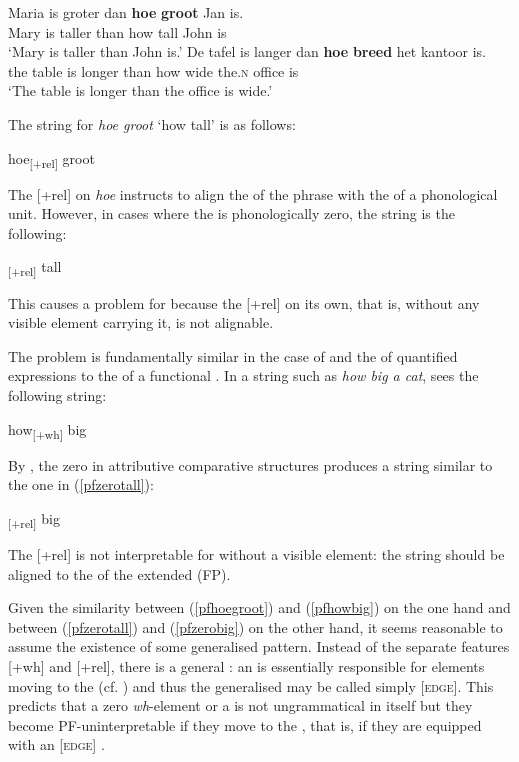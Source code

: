 \ea \label{dutch4}
\ea	\gll Maria	is groter	dan	\textbf{hoe} \textbf{groot}	Jan	is.\\
Mary is	taller than	how	tall John	is\\
\glt `Mary is taller than John is.'
\ex	\gll De tafel is langer dan	\textbf{hoe} \textbf{breed}	het kantoor is.\\
the	table	is longer	than	how	wide the.\textsc{n} office is\\
\glt `The table is longer than the office is wide.'
\z
\z

The  string for \textit{hoe groot} `how tall' is as follows:

\ea	hoe\textsubscript{[+rel]} groot \label{pfhoegroot}
\z

The [+rel]  on \textit{hoe} instructs  to align the  of the phrase with the  of a phonological unit. However, in cases where the  is phonologically zero, the  string is the following:

\ea	\textsubscript{[+rel]} tall \label{pfzerotall}
\z

This causes a problem for  because the [+rel]  on its own, that is, without any visible element carrying it, is not alignable.

The problem is fundamentally similar in the case of  and the  of quantified expressions to the  of a functional . In a string such as \textit{how big a cat},  sees the following string:

\ea	how\textsubscript{[+wh]} big \label{pfhowbig}
\z

By , the zero  in  attributive comparative structures produces a string similar to the one in (\ref{pfzerotall}):

\ea	\textsubscript{[+rel]} big \label{pfzerobig}
\z

The [+rel]  is not interpretable for  without a visible element: the string should be aligned to the  of the extended  (FP).

Given the similarity between (\ref{pfhoegroot}) and (\ref{pfhowbig}) on the one hand and between (\ref{pfzerotall}) and (\ref{pfzerobig}) on the other hand, it seems reasonable to assume the existence of some generalised pattern. Instead of the separate  features [+wh] and [+rel], there is a general  : an   is essentially responsible for elements moving to the  (cf. \citealt{mueller2003}) and thus the generalised  may be called simply [\textsc{edge}]. This predicts that a zero \textit{wh}-element or a  is not ungrammatical in itself but they become PF-uninterpretable if they move to the , that is, if they are equipped with an [\textsc{edge}] .


